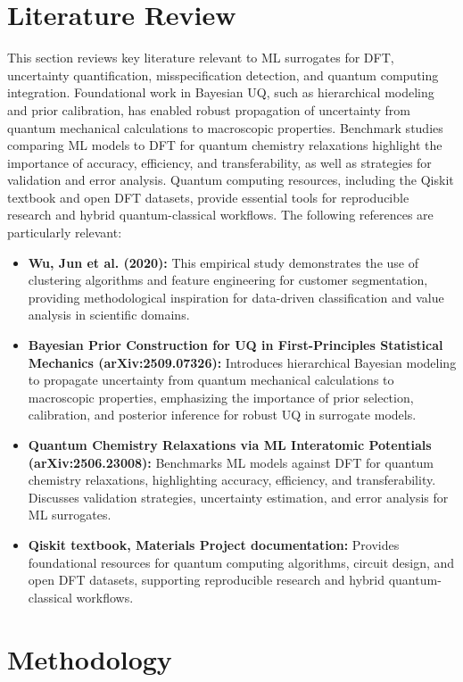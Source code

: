 \documentclass[12pt]{article}
\begin{document}
\section{Literature Review}
This section reviews key literature relevant to ML surrogates for DFT, uncertainty quantification, misspecification detection, and quantum computing integration. Foundational work in Bayesian UQ, such as hierarchical modeling and prior calibration, has enabled robust propagation of uncertainty from quantum mechanical calculations to macroscopic properties. Benchmark studies comparing ML models to DFT for quantum chemistry relaxations highlight the importance of accuracy, efficiency, and transferability, as well as strategies for validation and error analysis. Quantum computing resources, including the Qiskit textbook and open DFT datasets, provide essential tools for reproducible research and hybrid quantum-classical workflows. The following references are particularly relevant:
\begin{itemize}
    \item \textbf{Wu, Jun et al. (2020):} This empirical study demonstrates the use of clustering algorithms and feature engineering for customer segmentation, providing methodological inspiration for data-driven classification and value analysis in scientific domains.
    \item \textbf{Bayesian Prior Construction for UQ in First-Principles Statistical Mechanics (arXiv:2509.07326):} Introduces hierarchical Bayesian modeling to propagate uncertainty from quantum mechanical calculations to macroscopic properties, emphasizing the importance of prior selection, calibration, and posterior inference for robust UQ in surrogate models.
    \item \textbf{Quantum Chemistry Relaxations via ML Interatomic Potentials (arXiv:2506.23008):} Benchmarks ML models against DFT for quantum chemistry relaxations, highlighting accuracy, efficiency, and transferability. Discusses validation strategies, uncertainty estimation, and error analysis for ML surrogates.
    \item \textbf{Qiskit textbook, Materials Project documentation:} Provides foundational resources for quantum computing algorithms, circuit design, and open DFT datasets, supporting reproducible research and hybrid quantum-classical workflows.
\end{itemize}

\section{Methodology}
\end{document}
